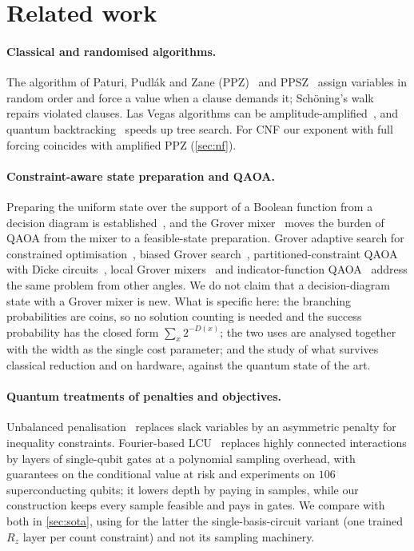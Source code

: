 \documentclass[10pt,twocolumn]{article}
\begin{document}
\section{Related work}
\paragraph{Classical and randomised algorithms.} The algorithm of Paturi, Pudl\'ak and Zane (PPZ)~\cite{ppz1999} and PPSZ~\cite{ppsz2005,hertli2014,ppszbetter} assign variables in random order and force a value when a clause demands it; Sch\"oning's walk~\cite{schoening1999} repairs violated clauses. Las Vegas algorithms can be amplitude-amplified~\cite{bhmt2002,ambainis2004,dunjko2018}, and quantum backtracking~\cite{montanaro2018} speeds up tree search. For CNF our exponent with full forcing coincides with amplified PPZ (\cref{sec:nf}).
\paragraph{Constraint-aware state preparation and QAOA.} Preparing the uniform state over the support of a Boolean function from a decision diagram is established~\cite{mozafari2020bdd}, and the Grover mixer~\cite{bartschi2020gm} moves the burden of QAOA from the mixer to a feasible-state preparation. Grover adaptive search for constrained optimisation~\cite{gilliam2021gas}, biased Grover search~\cite{wilkening2025biased}, partitioned-constraint QAOA with Dicke circuits~\cite{wilkie2025pcqaoa}, local Grover mixers~\cite{choi2026local} and indicator-function QAOA~\cite{bucher2025if} address the same problem from other angles. We do not claim that a decision-diagram state with a Grover mixer is new. What is specific here: the branching probabilities are coins, so no solution counting is needed and the success probability has the closed form $\sum_x2^{-D(x)}$; the two uses are analysed together with the width as the single cost parameter; and the study of what survives classical reduction and on hardware, against the quantum state of the art.
\paragraph{Quantum treatments of penalties and objectives.} Unbalanced penalisation~\cite{montanez2024unbalanced} replaces slack variables by an asymmetric penalty for inequality constraints. Fourier-based LCU~\cite{carrera2026fourier} replaces highly connected interactions by layers of single-qubit gates at a polynomial sampling overhead, with guarantees on the conditional value at risk and experiments on $106$ superconducting qubits; it lowers depth by paying in samples, while our construction keeps every sample feasible and pays in gates. We compare with both in \cref{sec:sota}, using for the latter the single-basis-circuit variant (one trained $R_z$ layer per count constraint) and not its sampling machinery.
\end{document}
